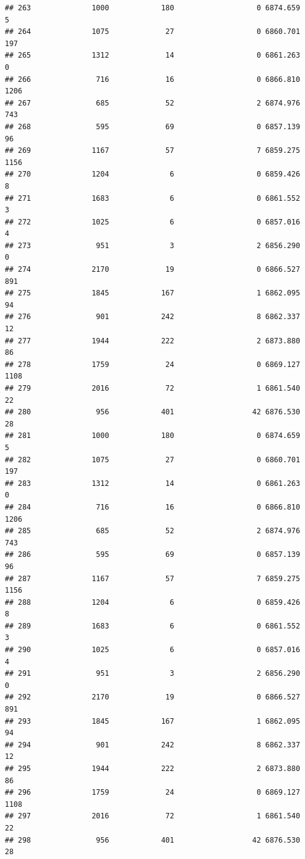 \documentclass[
]{article}
\begin{document}
\begin{verbatim}
## 263              1000            180                   0 6874.659    5
## 264              1075             27                   0 6860.701  197
## 265              1312             14                   0 6861.263    0
## 266               716             16                   0 6866.810 1206
## 267               685             52                   2 6874.976  743
## 268               595             69                   0 6857.139   96
## 269              1167             57                   7 6859.275 1156
## 270              1204              6                   0 6859.426    8
## 271              1683              6                   0 6861.552    3
## 272              1025              6                   0 6857.016    4
## 273               951              3                   2 6856.290    0
## 274              2170             19                   0 6866.527  891
## 275              1845            167                   1 6862.095   94
## 276               901            242                   8 6862.337   12
## 277              1944            222                   2 6873.880   86
## 278              1759             24                   0 6869.127 1108
## 279              2016             72                   1 6861.540   22
## 280               956            401                  42 6876.530   28
## 281              1000            180                   0 6874.659    5
## 282              1075             27                   0 6860.701  197
## 283              1312             14                   0 6861.263    0
## 284               716             16                   0 6866.810 1206
## 285               685             52                   2 6874.976  743
## 286               595             69                   0 6857.139   96
## 287              1167             57                   7 6859.275 1156
## 288              1204              6                   0 6859.426    8
## 289              1683              6                   0 6861.552    3
## 290              1025              6                   0 6857.016    4
## 291               951              3                   2 6856.290    0
## 292              2170             19                   0 6866.527  891
## 293              1845            167                   1 6862.095   94
## 294               901            242                   8 6862.337   12
## 295              1944            222                   2 6873.880   86
## 296              1759             24                   0 6869.127 1108
## 297              2016             72                   1 6861.540   22
## 298               956            401                  42 6876.530   28

\end{verbatim}
\end{document}
